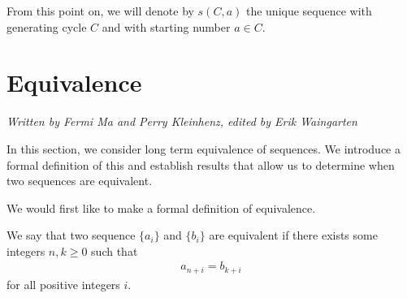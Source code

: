 \documentclass[runningheads,a4paper]{llncs}
\begin{document}
%

From this point on, we will denote by $s(C,a)$ the unique sequence with generating cycle $C$ and with starting number $a \in C$.

\section{Equivalence}
\label{equivalence}
\emph{Written by Fermi Ma and Perry Kleinhenz, edited by Erik Waingarten}

In this section, we consider long term equivalence of sequences. We introduce a formal definition of this and establish results that allow us to determine when two sequences are equivalent.  

We would first like to make a formal definition of equivalence. 
\begin{definition}
We say that two sequence $\{a_i\}$ and $\{b_i\}$ are equivalent if there exists some integers $n, k \geq 0$ such that 
\begin{align*}
a_{n+i} = b_{k+i}
\end{align*}
for all positive integers $i$. 
\end{definition}
\end{document}
